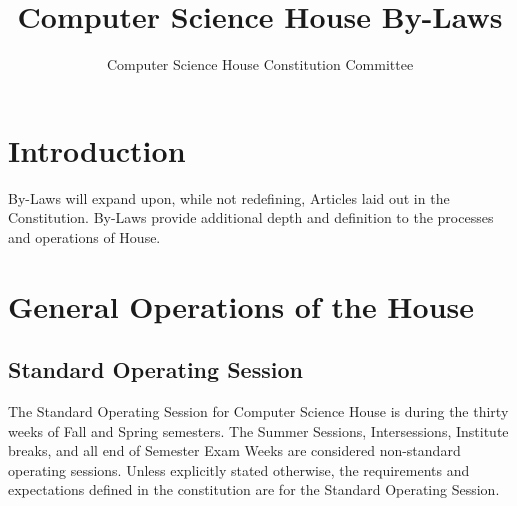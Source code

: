\documentclass{article}
\title{Computer Science House By-Laws}
\author{Computer Science House Constitution Committee}
\date{\datechanged}
\newcommand{\bylaw}[1]{\section{#1} \label{#1}}
\newcommand{\bsection}[1]{\subsection{#1} \label{#1}}
\begin{document}
\maketitle

\bylaw{Introduction}
By-Laws will expand upon, while not redefining, Articles laid out in the Constitution.
By-Laws provide additional depth and definition to the processes and operations of House.

\bylaw{General Operations of the House}
\bsection{Standard Operating Session}
The Standard Operating Session for Computer Science House is during the thirty weeks of Fall and Spring semesters.
The Summer Sessions, Intersessions, Institute breaks, and all end of Semester Exam Weeks are considered non-standard operating sessions.
Unless explicitly stated otherwise, the requirements and expectations deﬁned in the constitution are for the Standard Operating Session.
\end{document}

